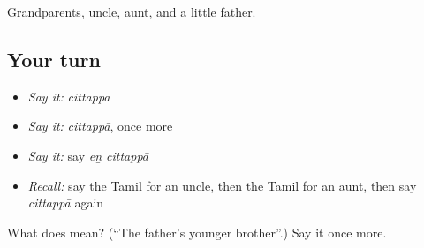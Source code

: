 \begin{grammarlens}[title={What you've built}]
Grandparents, uncle, aunt, and a little father.
\end{grammarlens}

\subsection*{Your turn}
\begin{itemize}
\raggedright
  \item \emph{Say it:} \emph{cittappā}
  \item \emph{Say it:} \emph{cittappā}, once more
  \item \emph{Say it:} say \emph{eṉ cittappā}
  \item \emph{Recall:} say the Tamil for an uncle, then the Tamil for an aunt, then say \emph{cittappā} again
\end{itemize}

\begin{tcolorbox}[breakable,colback=teal!4,colframe=teal!35!black,title={Before you move on}]
What does  mean? (\textquotedblleft{}The father's younger brother\textquotedblright{}.) Say it once more.
\end{tcolorbox}
